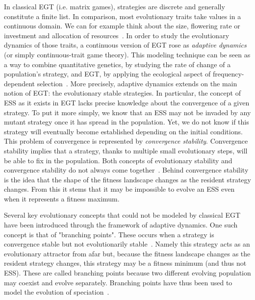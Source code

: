             In classical EGT (i.e. matrix games), strategies are discrete and generally constitute a finite list. In comparison, most evolutionary traits take values in a continuous domain. We can for example think about the size, flowering rate or investment and allocation of resources~\parencite{McGill2007}. In order to study the evolutionary dynamics of those traits, a continuous version of EGT rose as \emph{adaptive dynamics} (or simply continuous-trait game theory). This modeling technique can be seen as a way to combine quantitative genetics, by studying the rate of change of a population's strategy, and EGT, by applying the ecological aspect of frequency-dependent selection~\parencite{Geritz1998, McGill2007}. More precisely, adaptive dynamics extends on the main notion of EGT: the evolutionary stable strategies. In particular, the concept of ESS as it exists in EGT lacks precise knowledge about the convergence of a given strategy. To put it more simply, we know that an ESS may not be invaded by any mutant strategy once it has spread in the population. Yet, we do not know if this strategy will eventually become established depending on the initial conditions. This problem of convergence is represented by \emph{convergence stability}. Convergence stability implies that a strategy, thanks to multiple small evolutionary steps, will be able to fix in the population. Both concepts of evolutionary stability and convergence stability do not always come together~\parencite{Eshel1981, Eshel1983}. Behind convergence stability is the idea that the shape of the fitness landscape changes as the resident strategy changes. From this it stems that it may be impossible to evolve an ESS even when it represents a fitness maximum.

            Several key evolutionary concepts that could not be modeled by classical EGT have been introduced through the framework of adaptive dynamics. One such concept is that of "branching points". These occurs when a strategy is convergence stable but not evolutionarily stable~\parencite{Geritz1998}. Namely this strategy acts as an evolutionary attractor from afar but, because the fitness landscape changes as the resident strategy changes, this strategy may be a fitness minimum (and thus not ESS). These are called branching points because two different evolving population may coexist and evolve separately. Branching points have thus been used to model the evolution of speciation~\parencite{Geritz2004}. 

